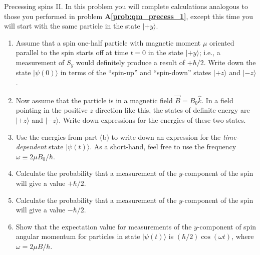 \newpage

\begin{aproblem}{Precessing spins II.}  
  In this problem you will complete calculations analogous to those
  you performed in problem {\bf A\ref{prob:qm_precess_1}}, except this
  time you will start with the same particle in the state
  $|\mbox{$+y$}\rangle$.

  \begin{enumerate}

  \item Assume that a spin one-half particle with magnetic moment
    $\mu$ oriented parallel to the spin starts off at time $t=0$ in
    the state $|\mbox{$+y$}\rangle$; i.e., a measurement of $S_y$
    would definitely produce a result of $+\hbar /2$.  Write down the
    state $|\psi(0)\rangle$ in terms of the ``spin-up'' and
    ``spin-down'' states $|\mbox{$+z$}\rangle$ and
    $|\mbox{$-z$}\rangle$.

  \item Now assume that the particle is in a magnetic field
    $\vec{B}=B_0 \widehat{k}$.  In a field pointing in the positive
    $z$ direction like this, the states of definite energy are
    $|\mbox{$+z$}\rangle$ and $|\mbox{$-z$}\rangle$.  Write down
    expressions for the energies of these two states.

  \item Use the energies from part (b) to write down an expression for
    the {\em time-dependent} state $|\psi(t)\rangle$.  As a
    short-hand, feel free to use the frequency $\omega \equiv 2\mu
    B_0/\hbar$.

  \item Calculate the probability that a measurement of the
    $y$-component of the spin will give a value $+\hbar/2$.
    
  \item Calculate the probability that a measurement of the
    $y$-component of the spin will give a value $-\hbar/2$.

  \item Show that the expectation value for measurements of the
    $y$-com\-ponent of spin angular momentum for particles in state
    $|\psi(t)\rangle$ is $(\hbar/2)\cos(\omega t)$, where $\omega =
    2\mu B/\hbar$.

  \end{enumerate}
\end{aproblem}

\newpage

